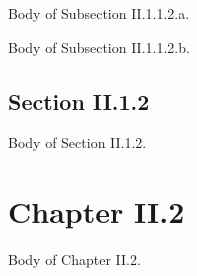 \documentclass[openright,twoside,11pt]{book}
\begin{document}
Body of Subsection II.1.1.2.a.

Body of Subsection II.1.1.2.b.

\let\subsubsection\subsubsectionSave

\section{Section II.1.2}
Body of Section II.1.2.

\chapter{Chapter II.2}
Body of Chapter II.2.
\end{document}
